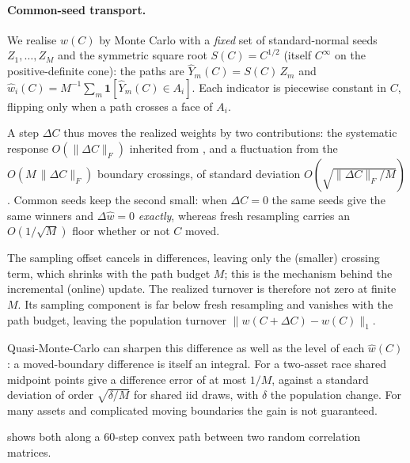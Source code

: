 \paragraph{Common-seed transport.}
We realise $w(C)$ by Monte Carlo with a \emph{fixed} set of standard-normal
seeds $Z_1, \dots, Z_M$ and the symmetric square root $S(C) = C^{1/2}$ (itself
$C^\infty$ on the positive-definite cone): the paths are
$\widehat{Y}_m(C) = S(C)\,Z_m$ and
$\widehat{w}_i(C) = M^{-1}\sum_m \mathbf{1}[\widehat{Y}_m(C) \in A_i]$.
Each
indicator is piecewise constant in $C$, flipping only when a path crosses a face
of $A_i$.

A step $\Delta C$ thus moves the realized weights by two contributions:
the systematic response $O(\|\Delta C\|_F)$ inherited from , and a
fluctuation from the $O(M\,\|\Delta C\|_F)$ boundary crossings, of standard
deviation $O(\sqrt{\|\Delta C\|_F/M})$.
Common seeds keep the second
small: when $\Delta C = 0$ the same seeds give the same winners and
$\Delta\widehat{w} = 0$ \emph{exactly}, whereas fresh resampling carries an
$O(1/\sqrt{M})$ floor whether or not $C$ moved.

The sampling offset cancels in
differences, leaving only the (smaller) crossing term, which shrinks with the path
budget $M$; this is the mechanism behind the incremental (online) update.
The
realized turnover is therefore not zero at finite $M$.
Its sampling component is
far below fresh resampling and vanishes with the path budget, leaving the
population turnover $\|w(C+\Delta C) - w(C)\|_1$.

Quasi-Monte-Carlo can sharpen this difference as well as the level of each
$\widehat{w}(C)$: a moved-boundary difference is itself an integral. For a two-asset
race shared midpoint points give a difference error of at most $1/M$, against a
standard deviation of order $\sqrt{\delta/M}$ for shared iid draws, with $\delta$ the
population change.
For many assets and complicated moving boundaries the gain is
not guaranteed.

 shows both along a $60$-step
convex path between two random correlation matrices.

